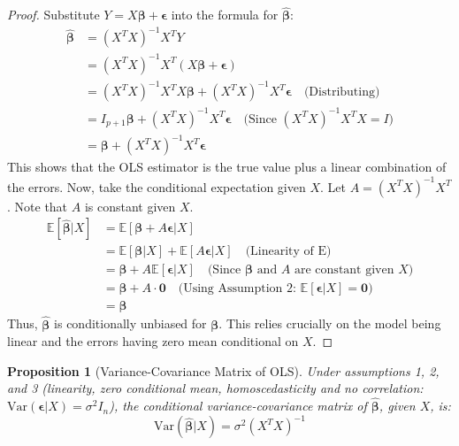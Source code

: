 \documentclass[11pt]{article}
\newtheorem{proposition}[theorem]{Proposition}
\theoremstyle{definition}
\newcommand{\E}{\mathbb{E}} %
\newcommand{\Var}{\mathrm{Var}} %
\newcommand{\T}{^T} %
\newcommand{\bbeta}{\bm{\beta}} %
\newcommand{\bepsilon}{\bm{\epsilon}} %
\newcommand{\bZero}{\mathbf{0}} %
\newcommand{\bhat}[1]{\hat{\bm{#1}}} %
\begin{document}
\begin{proof}
Substitute $Y = X\bbeta + \bepsilon$ into the formula for $\bhat{\beta}$:
\begin{align*} \bhat{\beta} &= (X\T X)^{-1} X\T Y \\ &= (X\T X)^{-1} X\T (X\bbeta + \bepsilon) \\ &= (X\T X)^{-1} X\T X \bbeta + (X\T X)^{-1} X\T \bepsilon \quad \text{(Distributing)} \\ &= I_{p+1} \bbeta + (X\T X)^{-1} X\T \bepsilon \quad \text{(Since } (X\T X)^{-1} X\T X = I) \\ &= \bbeta + (X\T X)^{-1} X\T \bepsilon \end{align*}
This shows that the OLS estimator is the true value plus a linear combination of the errors. Now, take the conditional expectation given $X$. Let $A = (X\T X)^{-1} X\T$. Note that $A$ is constant given $X$.
\begin{align*} \E[\bhat{\beta} | X] &= \E[\bbeta + A \bepsilon | X] \\ &= \E[\bbeta | X] + \E[A \bepsilon | X] \quad \text{(Linearity of E)} \\ &= \bbeta + A \E[\bepsilon | X] \quad \text{(Since } \bbeta \text{ and } A \text{ are constant given } X) \\ &= \bbeta + A \cdot \bZero \quad \text{(Using Assumption 2: } \E[\bepsilon|X]=\bZero) \\ &= \bbeta \end{align*}
Thus, $\bhat{\beta}$ is conditionally unbiased for $\bbeta$. This relies crucially on the model being linear and the errors having zero mean conditional on $X$.
\end{proof}

\begin{proposition}[Variance-Covariance Matrix of OLS]
\label{prop:ols_variance}
Under assumptions 1, 2, and 3 (linearity, zero conditional mean, homoscedasticity and no correlation: $\Var(\bepsilon|X)=\sigma^2 I_n$), the conditional variance-covariance matrix of $\bhat{\beta}$, given $X$, is:
\[ \Var(\bhat{\beta} | X) = \sigma^2 (X\T X)^{-1} \]
\end{proposition}
\end{document}
